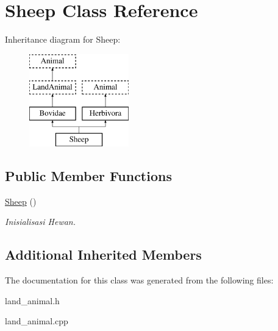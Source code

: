 \hypertarget{class_sheep}{}\section{Sheep Class Reference}
\label{class_sheep}
Inheritance diagram for Sheep\+:\begin{figure}[H]
\begin{center}
\leavevmode
\includegraphics[height=4.000000cm]{class_sheep}
\end{center}
\end{figure}
\subsection*{Public Member Functions}
\begin{DoxyCompactItemize}
\item 
\hyperlink{class_sheep_ad6a7b1b84995d149f45d2b28714eb8bf}{Sheep} ()\hypertarget{class_sheep_ad6a7b1b84995d149f45d2b28714eb8bf}{}\label{class_sheep_ad6a7b1b84995d149f45d2b28714eb8bf}

\begin{DoxyCompactList}\small\item\em Inisialisasi Hewan. \end{DoxyCompactList}\end{DoxyCompactItemize}
\subsection*{Additional Inherited Members}


The documentation for this class was generated from the following files\+:\begin{DoxyCompactItemize}
\item 
land\+\_\+animal.\+h\item 
land\+\_\+animal.\+cpp\end{DoxyCompactItemize}
